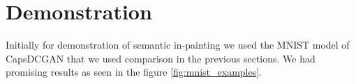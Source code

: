 
\section{Demonstration} %
\label{sec:demonstration}

Initially for demonstration of semantic in-painting we used the MNIST model of CapsDCGAN that we used comparison in the previous sections. We had promising results as seen in the figure \ref{fig:mnist_examples}.

\begin{figure}[H]
    \centering
    \\
    \centering
    \\
    \centering

\end{figure}
